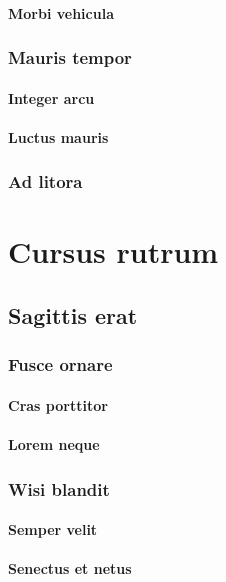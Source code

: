 \subsubsection{Morbi vehicula} \lipsum[17]
\subsection{Mauris tempor} \lipsum [18]
\subsubsection{Integer arcu} \lipsum[19]
\subsubsection{Luctus mauris} \lipsum[20]
\subsection{Ad litora} \lipsum [21-22]



\chapter{Cursus rutrum}

 \lipsum[1-2]

\section{Sagittis erat} \lipsum[3-4]
\subsection{Fusce ornare} \lipsum[5]
\subsubsection{Cras porttitor} \lipsum[6]
\subsubsection{Lorem neque} \lipsum[7]
\subsection{Wisi blandit} \lipsum[8]
\subsubsection{Semper velit} \lipsum[9]
\subsubsection{Senectus et netus} \lipsum[10]
